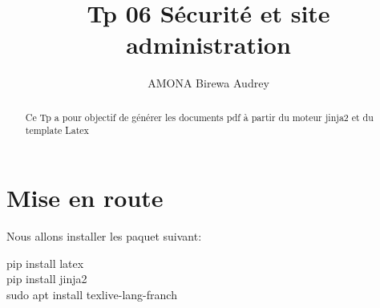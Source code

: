 \documentclass[11pt,a4paper]{article}
\author{AMONA Birewa Audrey}
\title{ Tp 06 Sécurité et site administration }
\begin{document}
\maketitle
\tableofcontents
\begin{abstract}
Ce Tp a pour objectif de générer les documents pdf à partir du moteur jinja2 et du template Latex
\end{abstract}
\section{Mise en route}
Nous allons installer les paquet suivant:
\begin{tcolorbox} 
pip install latex\\
pip install jinja2\\
sudo apt install texlive-lang-franch
\end{tcolorbox}
\end{document}
